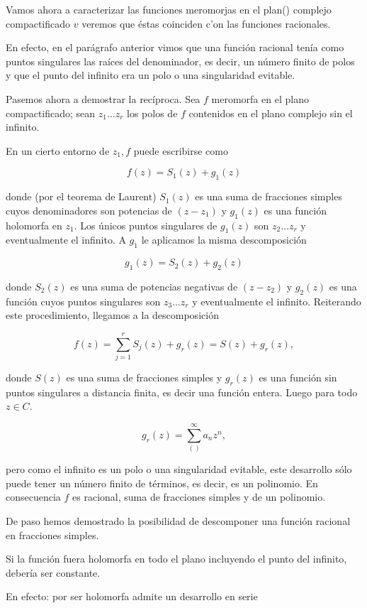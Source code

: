 \documentclass[10pt]{article}
\theoremstyle{plain}
\theoremstyle{definition}
\theoremstyle{remark}
\begin{document}
Vamos ahora a caracterizar las funciones meromorjas en el plan() complejo compactificado $v$ veremos que éstas coinciden c'on las funciones racionales.

En efecto, en el parágrafo anterior vimos que una función racional tenía como puntos singulares las raíces del denominador, es decir, un número finito de polos y que el punto del infinito era un polo o una singularidad evitable.

Pasemos ahora a demostrar la recíproca. Sea $f$ meromorfa en el plano compactificado; sean $z_{1} \ldots z_{r}$ los polos de $f$ contenidos en el plano complejo sin el infinito.

En un cierto entorno de $z_{1}, f$ puede escribirse como

$$
f(z)=S_{1}(z)+g_{1}(z)
$$

donde (por el teorema de Laurent) $S_{1}(z)$ es una suma de fracciones simples cuyos denominadores son potencias de $\left(z-z_{1}\right)$ y $g_{1}(z)$ es una función holomorfa en $z_{1}$. Los únicos puntos singulares de $g_{1}(z)$ son $z_{2} \ldots z_{r}$ y eventualmente el infinito. A $g_{1}$ le aplicamos la misma descomposición

$$
g_{1}(z)=S_{2}(z)+g_{2}(z)
$$

donde $S_{2}(z)$ es una suma de potencias negativas de $\left(z-z_{2}\right)$ y $g_{2}(z)$ es una función cuyos puntos singulares son $z_{3} \ldots z_{r}$ y eventualmente el infinito. Reiterando este procedimiento, llegamos a la descomposición

$$
f(z)=\sum_{j=1}^{r} S_{j}(z)+g_{r}(z)=S(z)+g_{r}(z),
$$

donde $S(z)$ es una suma de fracciones simples y $g_{r}(z)$ es una función sin puntos singulares a distancia finita, es decir una función entera. Luego para todo $z \in C$.

$$
g_{r}(z)=\sum_{()}^{\infty} a_{n} z^{n},
$$

pero como el infinito es un polo o una singularidad evitable, este desarrollo sólo puede tener un número finito de términos, es decir, es un polinomio. En consecuencia $f$ es racional, suma de fracciones simples y de un polinomio.

De paso hemos demostrado la posibilidad de descomponer una función racional en fracciones simples.

Si la función fuera holomorfa en todo el plano incluyendo el punto del infinito, debería ser constante.

En efecto: por ser holomorfa admite un desarrollo en serie
\end{document}
